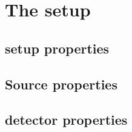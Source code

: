 \chapter{The setup}
\section{setup properties}
\section{Source properties}
\section{detector properties}